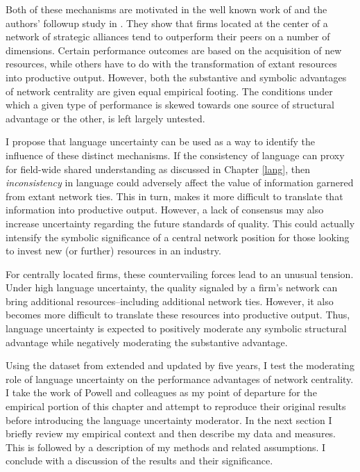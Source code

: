 Both of these mechanisms are motivated in the well known work of \citet{powell1996} and the authors' followup study in \citet{powell1999}. They show that firms located at the center of a network of strategic alliances tend to outperform their peers on a number of dimensions. Certain performance outcomes are based on the acquisition of new resources, while others have to do with the transformation of extant resources into productive output. However, both the substantive and symbolic advantages of network centrality are given equal empirical footing. The conditions under which a given type of performance is skewed towards one source of structural advantage or the other, is left largely untested. 

I propose that language uncertainty can be used as a way to identify the influence of these distinct mechanisms. If the consistency of language can proxy for field-wide shared understanding as discussed in Chapter \ref{lang}, then \emph{inconsistency} in language could adversely affect the value of information garnered from extant network ties. This in turn, makes it more difficult to translate that information into productive output. However, a lack of consensus may also increase uncertainty regarding the future standards of quality. This could actually intensify the symbolic significance of a central network position for those looking to invest new (or further) resources in an industry. 

For centrally located firms, these countervailing forces lead to an unusual tension. Under high language uncertainty, the quality signaled by a firm's network can bring additional resources--including additional network ties. However, it also becomes more difficult to translate these resources into productive output. Thus, language uncertainty is expected to positively moderate any symbolic structural advantage while negatively moderating the substantive advantage.

Using the dataset from \citet{powell1999} extended and updated by five years, I test the moderating role of language uncertainty on the performance advantages of network centrality. I take the work of Powell and colleagues as my point of departure for the empirical portion of this chapter and attempt to reproduce their original results before introducing the language uncertainty moderator. In the next section I briefly review my empirical context and then describe my data and measures. This is followed by a description of my methods and related assumptions. I conclude with a discussion of the results and their significance.

